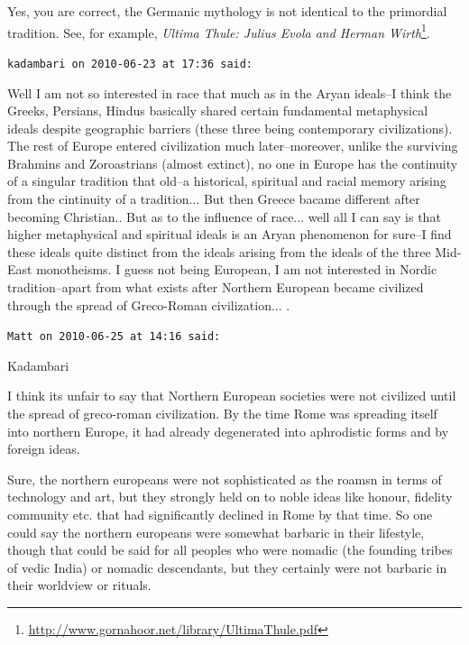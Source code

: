\begin{footnotesize}
\begin{sffamily}
Yes, you are correct, the Germanic mythology is not identical to the primordial tradition. See, for example, \textit{Ultima Thule: Julius Evola and Herman Wirth}\footnote{\url{http://www.gornahoor.net/library/UltimaThule.pdf}}.

\hfill

\texttt{kadambari on 2010-06-23 at 17:36 said:}

Well I am not so interested in race that much as in the Aryan ideals--I think the Greeks, Persians, Hindus basically shared certain fundamental metaphysical ideals despite geographic barriers (these three being contemporary civilizations). The rest of Europe entered civilization much later--moreover, unlike the surviving Brahmins and Zoroastrians (almost extinct), no one in Europe has the continuity of a singular tradition that old--a historical, spiritual and racial memory arising from the cintinuity of a tradition... But then Greece bacame different after becoming Christian.. But as to the influence of race... well all I can say is that higher metaphysical and spiritual ideals is an Aryan phenomenon for sure--I find these ideals quite distinct from the ideals arising from the ideals of the three Mid-East monotheisms. I guess not being European, I am not interested in Nordic tradition--apart from what exists after Northern European became civilized through the spread of Greco-Roman civilization... .

\hfill

\texttt{Matt on 2010-06-25 at 14:16 said:}

Kadambari

I think its unfair to say that Northern European societies were not civilized until the spread of greco-roman civilization. By the time Rome was spreading itself into northern Europe, it had already degenerated into aphrodistic forms and by foreign ideas.

Sure, the northern europeans were not sophisticated as the roamsn in terms of technology and art, but they strongly held on to noble ideas like honour, fidelity community etc. that had significantly declined in Rome by that time. So one could say the northern europeans were somewhat barbaric in their lifestyle, though that could be said for all peoples who were nomadic (the founding tribes of vedic India) or nomadic descendants, but they certainly were not barbaric in their worldview or rituals.

\hfill

\end{sffamily}
\end{footnotesize}

